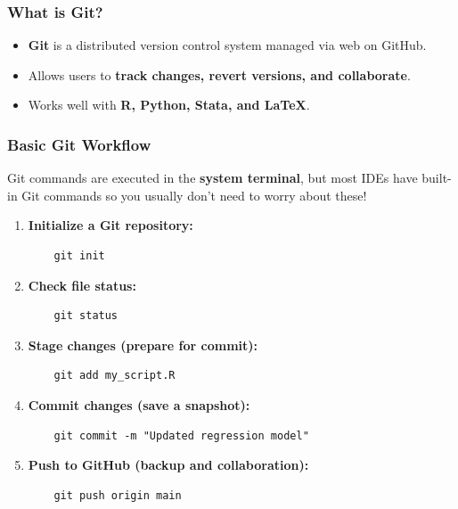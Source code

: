 \documentclass{beamer}
\begin{document}
\begin{frame}[fragile]
    \frametitle{What is Git?}

\begin{itemize}
    \item \textbf{Git} is a distributed version control system managed via web on GitHub.
    \item Allows users to \textbf{track changes, revert versions, and collaborate}.
    \item Works well with \textbf{R, Python, Stata, and LaTeX}.
\end{itemize}

\end{frame}

\begin{frame}[fragile]
    \frametitle{Basic Git Workflow}

Git commands are executed in the \textbf{system terminal},
but most IDEs have built-in Git commands so you usually don't need to worry about these!

\begin{enumerate}
    \item \textbf{Initialize a Git repository:}
    \begin{verbatim}
    git init
    \end{verbatim}
    \item \textbf{Check file status:}
    \begin{verbatim}
    git status
    \end{verbatim}
    \item \textbf{Stage changes (prepare for commit):}
    \begin{verbatim}
    git add my_script.R
    \end{verbatim}
    \item \textbf{Commit changes (save a snapshot):}
    \begin{verbatim}
    git commit -m "Updated regression model"
    \end{verbatim}
    \item \textbf{Push to GitHub (backup and collaboration):}
    \begin{verbatim}
    git push origin main
    \end{verbatim}
\end{enumerate}

\end{frame}
\end{document}
